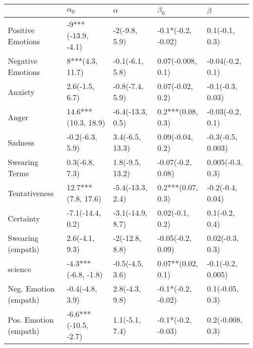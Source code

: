 \begin{tabular}{lllll}
\toprule
{} &            $\alpha_0$ &          $\alpha$ &           $\beta_0$ &            $\beta$ \\
\midrule
Positive Emotions     &    -9***(-13.9, -4.1) &     -2(-9.8, 5.9) &  -0.1*(-0.2, -0.02) &     0.1(-0.1, 0.3) \\
Negative Emotions     &       8***(4.3, 11.7) &   -0.1(-6.1, 5.8) &   0.07(-0.008, 0.1) &   -0.04(-0.2, 0.1) \\
Anxiety               &        2.6(-1.5, 6.7) &   -0.8(-7.4, 5.9) &    0.07(-0.02, 0.2) &   -0.1(-0.3, 0.03) \\
Anger                 &   14.6***(10.3, 18.9) &  -6.4(-13.3, 0.5) &   0.2***(0.08, 0.3) &   -0.03(-0.2, 0.1) \\
Sadness               &       -0.2(-6.3, 5.9) &   3.4(-6.5, 13.3) &    0.09(-0.04, 0.2) &  -0.3(-0.5, 0.003) \\
Swearing Terms        &        0.3(-6.8, 7.3) &   1.8(-9.5, 13.2) &   -0.07(-0.2, 0.08) &   0.005(-0.3, 0.3) \\
Tentativeness         &    12.7***(7.8, 17.6) &  -5.4(-13.3, 2.4) &   0.2***(0.07, 0.3) &   -0.2(-0.4, 0.04) \\
Certainty             &      -7.1(-14.4, 0.2) &  -3.1(-14.9, 8.7) &     0.02(-0.1, 0.2) &     0.1(-0.2, 0.4) \\
Swearing (empath)     &        2.6(-4.1, 9.3) &    -2(-12.8, 8.8) &   -0.05(-0.2, 0.09) &    0.02(-0.3, 0.3) \\
science               &   -4.3***(-6.8, -1.8) &   -0.5(-4.5, 3.6) &   0.07**(0.02, 0.1) &  -0.1(-0.2, 0.005) \\
Neg. Emotion (empath) &       -0.4(-4.8, 3.9) &    2.8(-4.3, 9.8) &  -0.1*(-0.2, -0.02) &    0.1(-0.05, 0.3) \\
Pos. Emotion (empath) &  -6.6***(-10.5, -2.7) &    1.1(-5.1, 7.4) &  -0.1*(-0.2, -0.03) &   0.2(-0.008, 0.3) \\
\bottomrule
\end{tabular}
